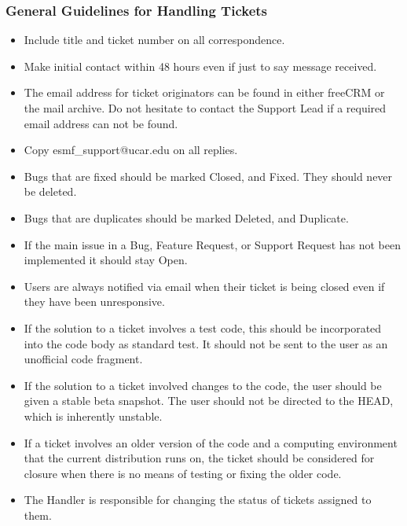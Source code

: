 \subsubsection{General Guidelines for Handling Tickets}
\begin{itemize}
\item Include title and ticket number on all correspondence.
\item Make initial contact within 48 hours even if just to say message received.
\item The email address for ticket originators can be found in either freeCRM or the mail archive. Do not hesitate to contact the Support Lead if a required email address can not be found. 
\item Copy esmf\_support@ucar.edu on all replies.
\item Bugs that are fixed should be marked Closed, and Fixed. They should never be deleted. 
\item Bugs that are duplicates should be marked Deleted, and Duplicate. 
\item If the main issue in a Bug, Feature Request, or Support Request has not been implemented it should stay Open.
\item Users are always notified via email when their ticket is being closed even if they have been unresponsive.  
\item If the solution to a ticket involves a test code, this should be incorporated into the code body as standard test. It should not be sent to the user as an unofficial code fragment. 
\item If the solution to a ticket involved changes to the code, the user should be given a stable beta snapshot. The user should not be directed to the HEAD, which is inherently unstable.  
\item If a ticket involves an older version of the code and a computing environment that the current distribution runs on, the ticket should be considered for closure when there is no means of testing or fixing the older code. 
\item The Handler is responsible for changing the status of tickets assigned to them.  
\end{itemize}

